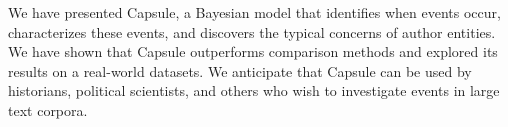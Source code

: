 
We have presented Capsule, a Bayesian model that identifies when events occur, characterizes these events, and discovers the typical concerns of author entities.  We have shown that Capsule outperforms comparison methods and explored its results on a real-world datasets.
We anticipate that Capsule %
can be used by historians, political scientists, and others who wish to investigate events in large text corpora.  
